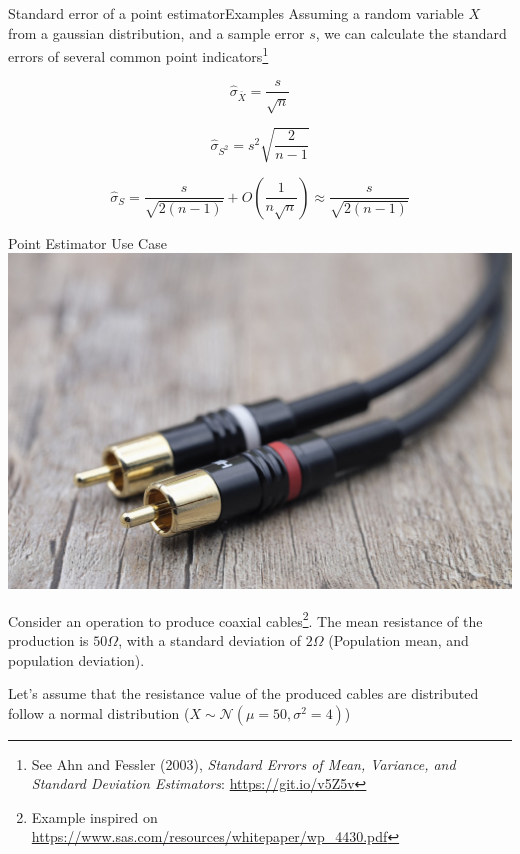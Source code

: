 \begin{frame}{Standard error of a point estimator}{Examples}
  Assuming a random variable $X$ from a gaussian distribution, and a sample error $s$, we can calculate the standard errors of several common point indicators\footnote{See Ahn and Fessler (2003), \textit{Standard Errors of Mean, Variance, and Standard Deviation Estimators}: \url{https://git.io/v5Z5v}}

\begin{equation*}
\hat{\sigma}_{\bar{X}} = \frac{s}{\sqrt{n}}
\end{equation*}

\begin{equation*}
\hat{\sigma}_{S^2} = s^2\sqrt{\frac{2}{n-1}}
\end{equation*}

\begin{equation*}
\hat{\sigma}_{S} = \frac{s}{\sqrt{2(n-1)}} + O\left(\frac{1}{n\sqrt{n}}\right)\approx \frac{s}{\sqrt{2(n-1)}}
\end{equation*}\bigskip
\end{frame}

\begin{frame}{Point Estimator Use Case}
  \includegraphics[width=.4\textwidth]{../img/pixabay_cable}
  \bigskip

  Consider an operation to produce coaxial cables\footnote{Example inspired on \url{https://www.sas.com/resources/whitepaper/wp_4430.pdf}}. The mean resistance of the production is $50\Omega$, with a standard deviation of $2\Omega$ (Population mean, and population deviation).\bigskip

  Let's assume that the resistance value of the produced cables are distributed follow a normal distribution ($X\sim\mathcal{N}\left(\mu=50,\sigma^2=4\right)$)
\end{frame}


